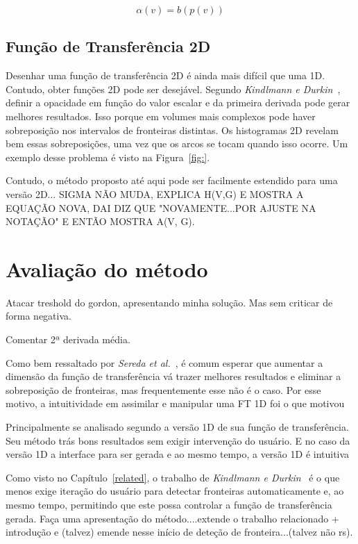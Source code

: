 \begin{equation} \label{eq:alpha}
	\alpha(v) = b(p(v))
\end{equation}

    
\subsection{Função de Transferência 2D}
\label{gordon.2d}
    Desenhar uma função de transferência 2D é ainda mais difícil que uma 1D. Contudo, obter funções 2D pode ser desejável. Segundo \textit{Kindlmann e Durkin}~\cite{gordon}, definir a opacidade em função do valor escalar e da primeira derivada pode gerar melhores resultados. Isso porque em volumes mais complexos pode haver sobreposição nos intervalos de fronteiras distintas. Os histogramas 2D revelam bem essas sobreposições, uma vez que os arcos se tocam quando isso ocorre. Um exemplo desse problema é visto na Figura~\ref{fig:}.
    
    Contudo, o método proposto até aqui pode ser facilmente estendido para uma versão 2D... SIGMA NÃO MUDA, EXPLICA H(V,G) E MOSTRA A EQUAÇÃO NOVA, DAI DIZ QUE "NOVAMENTE...POR AJUSTE NA NOTAÇÃO" E ENTÃO MOSTRA A(V, G).
    
\section{Avaliação do método}
\label{gordon.aval}    
    Atacar treshold do gordon, apresentando minha solução. Mas sem criticar de forma negativa.
    
    Comentar 2ª derivada média.
    
    Como bem ressaltado por \textit{Sereda et al.}~\cite{sereda1}, é comum esperar que aumentar a dimensão da função de transferência vá trazer melhores resultados e eliminar a sobreposição de fronteiras, mas frequentemente esse não é o caso. Por esse motivo, a intuitividade em assimilar e manipular uma FT 1D foi o que motivou
    
    
    Principalmente se analisado segundo a versão 1D de sua função de transferência. Seu método trás bons resultados sem exigir intervenção do usuário. E no caso da versão 1D a interface para ser gerada e ao mesmo tempo, a versão 1D é intuitiva
    
    
    Como visto no Capítulo~\ref{related}, o trabalho de \textit{Kindlmann e Durkin}~\cite{gordon} é o que menos exige iteração do usuário para detectar fronteiras automaticamente e, ao mesmo tempo, permitindo que este possa controlar a função de transferência gerada.
    Faça uma apresentação do método....extende o trabalho relacionado + introdução e (talvez) emende nesse início de deteção de fronteira...(talvez não rs).